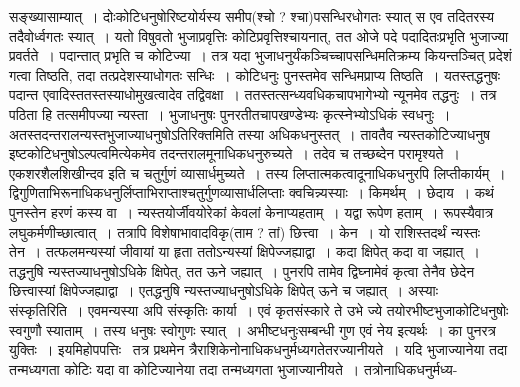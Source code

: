 \documentclass[11pt, openany]{book}
\begin{document}
\noindent सङ्ख्यासाम्यात्~। दोःकोटिधनुषोरिष्टयोर्यस्य समीप(श्चो ? श्चा)पसन्धिरधोगतः स्यात् स एव तदितरस्य तदैवोर्ध्वगतः स्यात्~। यतो विषुवतो भुजाप्रवृत्तिः कोटिप्रवृत्तिश्चायनात्, तत ओजे पदे पदादितःप्रभृति भुजाज्या प्रवर्तते~। पदान्तात् प्रभृति च कोटिज्या~। तत्र यदा
भुजाधनुर्यंकञ्चिच्चापसन्धिमतिक्रम्य कियन्तञ्चित् प्रदेशं गत्वा तिष्ठति, तदा तत्प्रदेशस्याधोगतः सन्धिः~। कोटिधनुः पुनस्तमेव सन्धिमप्राप्य तिष्ठति~। यतस्तद्धनुषः पदान्त एवादिस्ततस्तस्याधोमुखत्वादेव तद्विवक्षा~। ततस्तत्सन्ध्यवधिकचापभागेभ्यो न्यूनमेव तद्धनुः~। तत्र पठिता हि तत्समीपज्या न्यस्ता~। भुजाधनुषः पुनरतीतचापखण्डेभ्यः कृत्स्नेभ्योऽधिकं स्वधनुः~। अतस्तदन्तरालन्यस्तभुजाज्याधनुषोऽतिरिक्तमिति तस्या अधिकधनुस्तत्~। तावतैव न्यस्तकोटिज्याधनुष इष्टकोटिधनुषोऽल्पत्वमित्येकमेव तदन्तरालमूनाधिकधनुरुच्यते~। तदेव च तच्छब्देन परामृश्यते~। {\qt एकशरशैलशिखीन्दव} इति च चतुर्गुणं व्यासार्धमुच्यते~। तस्य लिप्तात्मकत्वादूनाधिकधनुरपि लिप्तीकार्यम्~। द्विगुणिताभिरूनाधिकधनुर्लिप्ताभिराप्ताश्चतुर्गुणव्यासार्धलिप्ताः क्वचिन्न्यस्याः~। किमर्थम्~। छेदाय~। कथं पुनस्तेन हरणं कस्य वा~। न्यस्तयोर्जीवयोरेकां केवलां केनाप्यहताम्~। यद्वा रूपेण हताम्~। रूपस्यैवात्र लघुकर्मणीच्छात्वात्~। तत्रापि विशेषाभावादविकृ(ताम ? तां) छित्त्वा~। केन~। यो राशिस्तदर्थं न्यस्तः तेन~। तत्फलमन्यस्यां जीवायां या हृता ततोऽन्यस्यां क्षिपेज्जह्याद्वा~। कदा क्षिपेत् कदा वा जह्यात्~। तद्धनुषि न्यस्तज्याधनुषोऽधिके क्षिपेत्, तत ऊने जह्यात्~। पुनरपि तामेव द्विघ्नामेवं कृत्वा तेनैव छेदेन छित्त्वास्यां क्षिपेज्जह्याद्वा~। एतद्धनुषि न्यस्तज्याधनुषोऽधिके क्षिपेत् ऊने च जह्यात्~। अस्याः संस्कृतिरिति~। एवमन्यस्या अपि संस्कृतिः कार्या~। एवं कृतसंस्कारे ते उभे ज्ये तयोरभीष्टभुजाकोटिधनुषोः स्वगुणौ स्याताम्~। तस्य धनुषः स्वोगुणः स्यात्~। अभीष्टधनुःसम्बन्धी गुण एवं नेय इत्यर्थः~। का पुनरत्र युक्तिः~। इयमिहोपपत्तिः \textendash\ तत्र प्रथमेन त्रैराशिकेनोनाधिकधनुर्मध्यगतेतरज्यानीयते~। यदि भुजाज्यानेया तदा तन्मध्यगता कोटिः यदा वा कोटिज्यानेया तदा तन्मध्यगता भुजाज्यानीयते~। तत्रोनाधिकधनुर्मध्य-

\newpage
\end{document}
